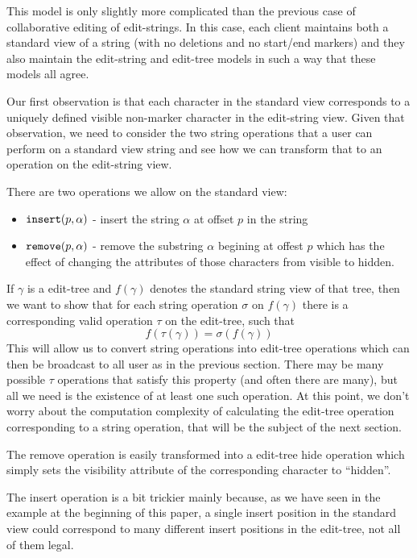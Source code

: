 \documentclass{amsart}
\begin{document}
This model is only slightly more complicated than the previous case of
collaborative editing of edit-strings.  In this case, each client maintains
both a standard view of a string (with no deletions and no start/end markers)
and they also maintain the edit-string and edit-tree models in such a way
that these models all agree.

Our first observation is that each character in the standard view corresponds
to a uniquely defined visible non-marker character in the edit-string view. 
Given that observation,
we need to consider the two string operations that a user can perform on a
standard view string and see how we can transform that to an operation on 
the edit-string view.

There are two operations we allow on the standard view:
\begin{itemize}
\item ${\tt insert}(p,\alpha)$ - insert the string $\alpha$ at offset $p$ in the string
\item ${\tt remove}(p,\alpha)$ - remove the substring $\alpha$ begining at offest $p$
which has the effect of changing the attributes of those characters from visible to hidden.
\end{itemize}

If $\gamma$ is a edit-tree and $f(\gamma)$ denotes the standard string view
of that tree, then we want to show that for each string operation $\sigma$
on $f(\gamma)$ there is a corresponding valid operation $\tau$
on the edit-tree, such that 
\[
f(\tau(\gamma)) = \sigma(f(\gamma))
\]
This will allow us to convert string operations into edit-tree operations which
can then be broadcast to all user as in the previous section. There may be many possible $\tau$ operations that satisfy this property (and often there are many), but all we need is the existence of at least one such operation. At this point, we don't worry about the computation complexity of calculating the edit-tree operation corresponding to a string operation, that will be the subject of the next section.

The remove operation is easily transformed into a edit-tree hide operation which 
simply sets the visibility attribute of the corresponding character to ``hidden''.

The insert operation is a bit trickier mainly because, as we have
seen in the example at the beginning of this paper,
a single insert position in
the standard view could correspond to many different insert positions in the 
edit-tree, not all of them legal.
\end{document}
